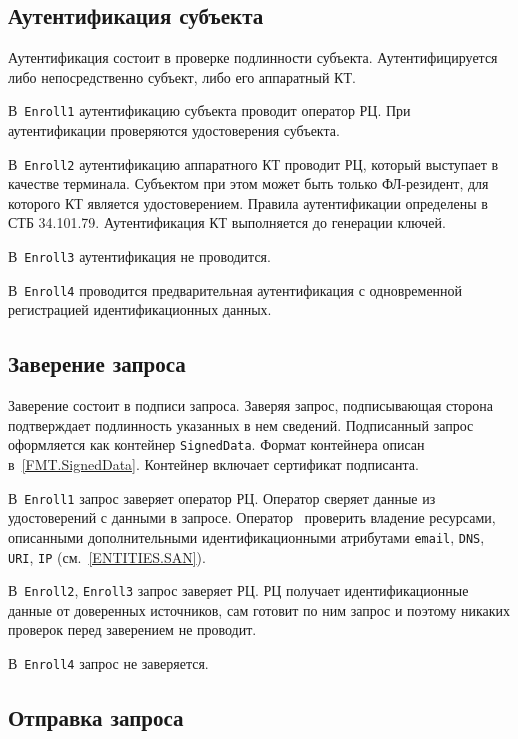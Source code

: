 \subsection{Аутентификация субъекта}\label{PROCESSES.Enroll.Auth}

Аутентификация состоит в проверке подлинности субъекта.
Аутентифицируется либо непосредственно субъект, либо его аппаратный КТ. 

В~\texttt{Enroll1} аутентификацию субъекта проводит оператор РЦ.
При аутентификации проверяются удостоверения субъекта. 

В~\texttt{Enroll2} аутентификацию аппаратного КТ проводит РЦ, который 
выступает в качестве терминала. Субъектом при этом может быть только 
ФЛ-резидент, для которого КТ является удостоверением. Правила 
аутентификации определены в СТБ 34.101.79. 
Аутентификация КТ выполняется до генерации ключей. 

В~\texttt{Enroll3} аутентификация не проводится.

В~\texttt{Enroll4} проводится предварительная аутентификация
с одновременной регистрацией идентификационных данных.

\subsection{Заверение запроса}\label{PROCESSES.Enroll.Signed}

Заверение состоит в подписи запроса. Заверяя запрос,
подписывающая сторона подтверждает подлинность указанных в нем сведений.
Подписанный запрос оформляется как контейнер \texttt{SignedData}.
Формат контейнера описан в~\ref{FMT.SignedData}. 
Контейнер включает сертификат подписанта.

В~\texttt{Enroll1} запрос заверяет оператор РЦ.
Оператор сверяет данные из удостоверений с данными в запросе.
%
Оператор~ проверить владение ресурсами, описанными
дополнительными идентификационными атрибутами \texttt{email}, \texttt{DNS},
\texttt{URI}, \texttt{IP} (см.~\ref{ENTITIES.SAN}).

В~\texttt{Enroll2}, \texttt{Enroll3} запрос заверяет РЦ.
РЦ получает идентификационные данные от доверенных источников,
сам готовит по ним запрос и поэтому никаких проверок перед заверением
не проводит.

В~\texttt{Enroll4} запрос не заверяется.

\subsection{Отправка запроса}\label{PROCESSES.Enroll.Enveloped}

